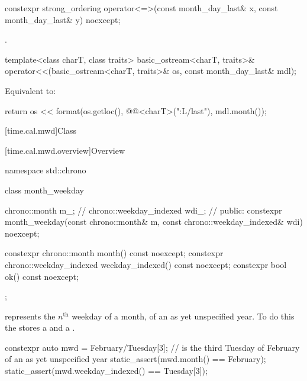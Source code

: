%
\begin{itemdecl}
constexpr strong_ordering operator<=>(const month_day_last& x, const month_day_last& y) noexcept;
\end{itemdecl}

\begin{itemdescr}
\pnum
\returns
{}.
\end{itemdescr}

%
\begin{itemdecl}
template<class charT, class traits>
  basic_ostream<charT, traits>&
    operator<<(basic_ostream<charT, traits>& os, const month_day_last& mdl);
\end{itemdecl}

\begin{itemdescr}
\pnum
\effects
Equivalent to:
\begin{codeblock}
return os << format(os.getloc(), @@<charT>("{:L}/last"), mdl.month());
\end{codeblock}
\end{itemdescr}

[time.cal.mwd]{Class }

[time.cal.mwd.overview]{Overview}

\begin{codeblock}
namespace std::chrono {
  class month_weekday {
    chrono::month           m_;         // \expos
    chrono::weekday_indexed wdi_;       // \expos
  public:
    constexpr month_weekday(const chrono::month& m, const chrono::weekday_indexed& wdi) noexcept;

    constexpr chrono::month           month()           const noexcept;
    constexpr chrono::weekday_indexed weekday_indexed() const noexcept;
    constexpr bool ok() const noexcept;
  };
}
\end{codeblock}

\pnum
{} represents the $n^\text{th}$ weekday of a month,
of an as yet unspecified year.
To do this the  stores a  and a .

\pnum
\begin{example}
\begin{codeblock}
constexpr auto mwd
    = February/Tuesday[3];              //  is the third Tuesday of February of an as yet unspecified year
static_assert(mwd.month() == February);
static_assert(mwd.weekday_indexed() == Tuesday[3]);
\end{codeblock}
\end{example}

